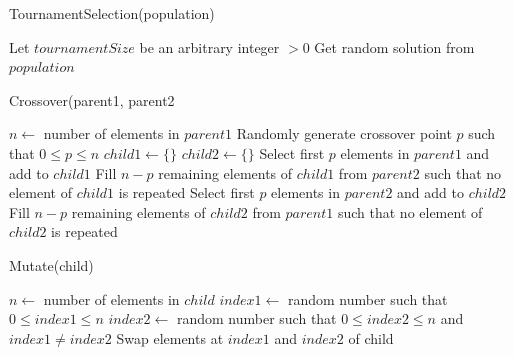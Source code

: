 \documentclass[11pt]{report}
\begin{document}
        \begin{algorithm}[!h]
            \DontPrintSemicolon
            \caption{TournamentSelection(population)}
            \label{alg:gaTourn}
            Let $tournamentSize$ be an arbitrary integer $> 0$\;
            {
                Get random solution from $population$\;
            }
        \end{algorithm}
        
        \begin{algorithm}[!h]
            \DontPrintSemicolon
            \caption{Crossover(parent1, parent2}
            \label{alg:gaCross}
            $n\gets$ number of elements in $parent1$\;
            Randomly generate crossover point $p$ such that $0\leq p \leq n$\;
            $child1\gets\{\}$\;
            $child2\gets\{\}$\;
            Select first $p$ elements in $parent1$ and add to $child1$\;
            Fill $n - p$ remaining elements of $child1$ from $parent2$ such that no element of $child1$ is repeated\;
            Select first $p$ elements in $parent2$ and add to $child2$\;
            Fill $n - p$ remaining elements of $child2$ from $parent1$ such that no element of $child2$ is repeated\;
            
        \end{algorithm}
        
        \begin{algorithm}[!h]
            \DontPrintSemicolon
            \caption{Mutate(child)}
            \label{alg:mutate}
            $n\gets$ number of elements in $child$\;
            $index1\gets$ random number such that $0\leq index1\leq n$\;
            $index2\gets$ random number such that $0 \leq index2\leq n$ and $index1\neq index2$\;
            Swap elements at $index1$ and $index2$ of child\;
            \;
        \end{algorithm}

        \newpage
        
\end{document}
